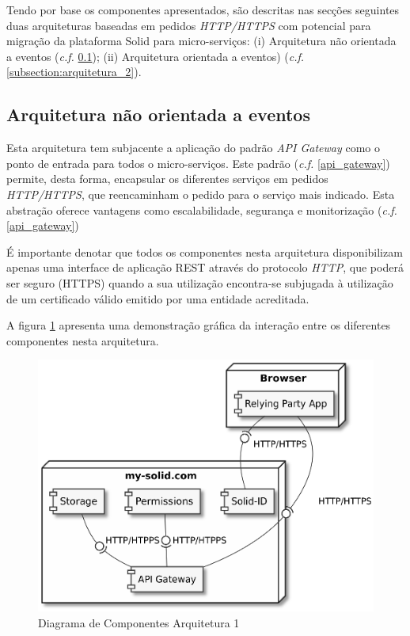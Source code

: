 Tendo por base os componentes apresentados, são descritas nas secções seguintes duas arquiteturas baseadas em pedidos \emph{HTTP/HTTPS} com potencial para migração da plataforma Solid para micro-serviços: (i) Arquitetura não orientada a eventos  (\emph{c.f.} \ref{subsection:arquitetura_1}); (ii) Arquitetura orientada a eventos) (\emph{c.f.} \ref{subsection:arquitetura_2}).

\subsection{Arquitetura não orientada a eventos} \label{subsection:arquitetura_1}

Esta arquitetura tem subjacente a aplicação do padrão \emph{API Gateway} como o ponto de entrada para todos o micro-serviços. Este padrão (\emph{c.f.} \ref{api_gateway}) permite, desta forma, encapsular os diferentes serviços em pedidos \emph{HTTP/HTTPS}, que reencaminham o pedido para o serviço mais indicado. Esta abstração oferece vantagens como escalabilidade, segurança e monitorização (\emph{c.f.} \ref{api_gateway})

É importante denotar que todos os componentes nesta arquitetura disponibilizam apenas uma interface de aplicação REST através do protocolo \emph{HTTP}, que poderá ser seguro (HTTPS) quando a sua utilização encontra-se subjugada à utilização de um certificado válido emitido por uma entidade acreditada.

A figura \ref{component_diagram_arquitetura1} apresenta uma demonstração gráfica da interação entre os diferentes componentes nesta arquitetura.

\begin{figure}[H]
    \begin{center}
    \includegraphics[width=0.6 \textwidth]{figures/arquitetura_1_diagrama_componentes.eps}
    \caption{Diagrama de Componentes Arquitetura 1}
    \label{component_diagram_arquitetura1}
    \end{center}
\end{figure}

